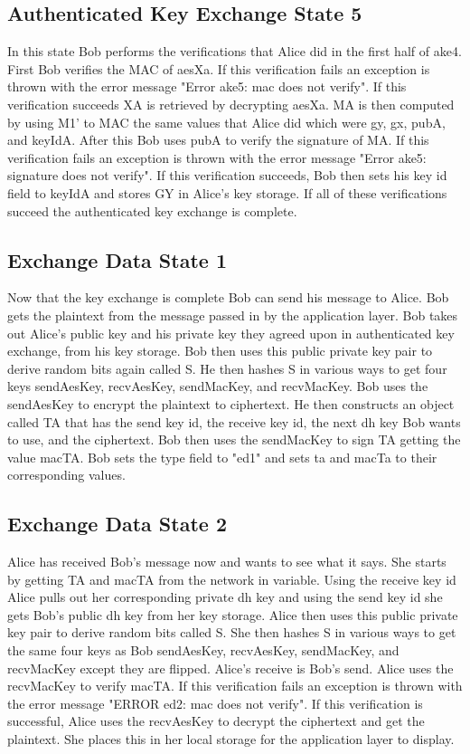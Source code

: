 \subsection{Authenticated Key Exchange State 5}


In this state Bob performs the verifications that Alice did in the first half of ake4. First Bob verifies the MAC of aesXa. If this verification fails an exception is thrown with the error message "Error ake5: mac does not verify". If this verification succeeds XA is retrieved by decrypting aesXa. MA is then computed by using M1' to MAC the same values that Alice did which were gy, gx, pubA, and keyIdA. After this Bob uses pubA to verify the signature of MA. If this verification fails an exception is thrown with the error message "Error ake5: signature does not verify". If this verification succeeds, Bob then sets his key id field to keyIdA and stores GY in Alice's key storage. If all of these verifications succeed the authenticated key exchange is complete.


\subsection{Exchange Data State 1}


Now that the key exchange is complete Bob can send his message to Alice. Bob gets the plaintext from the message passed in by the application layer. Bob takes out Alice's public key and his private key they agreed upon in authenticated key exchange, from his key storage. Bob then uses this public private key pair to derive random bits again called S. He then hashes S in various ways to get four keys sendAesKey, recvAesKey, sendMacKey, and recvMacKey. Bob uses the sendAesKey to encrypt the plaintext to ciphertext. He then constructs an object called TA that has the send key id, the receive key id, the next dh key Bob wants to use, and the ciphertext. Bob then uses the sendMacKey to sign TA getting the value macTA. Bob sets the type field to "ed1" and sets ta and macTa to their corresponding values.
 
\subsection{Exchange Data State 2}


Alice has received Bob's message now and wants to see what it says. She starts by getting TA and macTA from the network in variable. Using the receive key id Alice pulls out her corresponding private dh key and using the send key id she gets Bob's public dh key from her key storage. Alice then uses this public private key pair to derive random bits called S. She then hashes S in various ways to get the same four keys as Bob sendAesKey, recvAesKey, sendMacKey, and recvMacKey except they are flipped. Alice's receive is Bob's send. Alice uses the recvMacKey to verify macTA. If this verification fails an exception is thrown with the error message "ERROR ed2: mac does not verify". If this verification is successful, Alice uses the recvAesKey to decrypt the ciphertext and get the plaintext. She places this in her local storage for the application layer to display.


